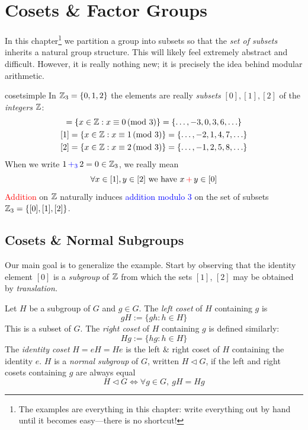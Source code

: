 \graphicspath{{6coset/asy/}}

\section{Cosets \& Factor Groups}\label{chap:coset}

In this chapter\footnote{The examples are everything in this chapter: write everything out by hand until it becomes easy---there is no shortcut!} we partition a group into subsets so that the \emph{set of subsets} inherits a natural group structure. This will likely feel extremely abstract and difficult. However, it is really nothing new; it is precisely the idea behind modular arithmetic.

\begin{example}{}{cosetsimple}
	In $\mathbb{Z}_3=\{0,1,2\}$ the elements are really \emph{subsets} $[0],[1],[2]$ of the \emph{integers} $\mathbb{Z}$:
	\begin{gather*}
	[0]=\{x\in\Z:x \equiv 0\negthickspace\pmod 3\} =\{\ldots,-3,0,3,6,\ldots\}\\
	[1]=\{x\in\Z:x \equiv 1\negthickspace\pmod 3\} =\{\ldots,-2,1,4,7,\ldots\}\\
	[2]=\{x\in\Z:x \equiv 2\negthickspace\pmod 3\} =\{\ldots,-1,2,5,8,\ldots\}
	\end{gather*}
	When we write $1\operatorname{\textcolor{blue}{+_3}}2=0\in\mathbb{Z}_3$, we really mean
	\[\forall x\in[1], y\in[2]\text{ we have }x\operatorname{\textcolor{red}{+}}y\in [0]\]
	\textcolor{red}{Addition} on $\mathbb{Z}$ naturally induces \textcolor{blue}{addition modulo 3} on the set of subsets $\mathbb{Z}_3=\{[0],[1],[2]\}$.
\end{example}


\subsection{Cosets \& Normal Subgroups}\label{sec:cosetnormal}

Our main goal is to generalize the example. Start by observing that the identity element $[0]$ is a \emph{subgroup} of $\mathbb{Z}$ from which the sets $[1]$, $[2]$ may be obtained by \emph{translation.}



\begin{defn}{}{}
	Let $H$ be a subgroup of $G$ and $g\in G$. The \emph{left coset} of $H$ containing $g$ is 
	\[gH:=\{gh:h\in H\}\tag{$x\in gH\iff \exists h\in H$ such that $x=gh$}\]
	This is a subset of $G$. The \emph{right coset} of $H$ containing $g$ is defined similarly:
	\[Hg:=\{hg:h\in H\}\]
	The \emph{identity coset} $H=eH=He$ is the left \& right coset of $H$ containing the identity $e$.\smallbreak
	$H$ is a \emph{normal subgroup} of $G$, written $H\triangleleft G$, if the left and right cosets containing $g$ are always equal
	\[H\triangleleft G\iff \forall g\in G,\ gH=Hg\]
\end{defn}

